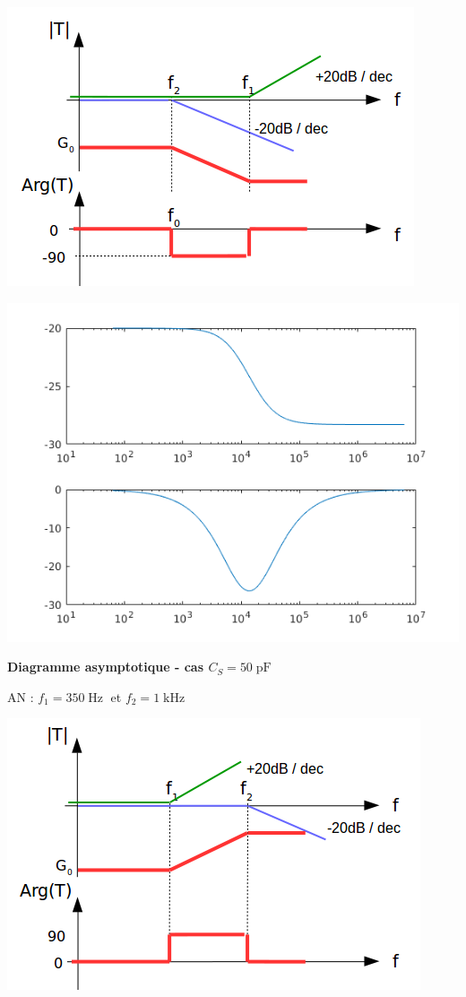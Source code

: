 \documentclass[a4paper,french]{paper}
\begin{document}
\begin{center}
	\includegraphics{images/TD/TD5_ex2_c1.png}
\end{center}

\begin{center}
	\includegraphics{images/TD/TD5_ex2_cs5pf.png}
\end{center}

\qquad

\textbf{\large Diagramme asymptotique - cas $C_S = 50\operatorname{pF}$}

AN : $f_1 = 350\operatorname{Hz}$ et $f_2 = 1\operatorname{kHz}$

\begin{center}
	\includegraphics{images/TD/TD5_ex2_c2.png}
\end{center}
\end{document}
